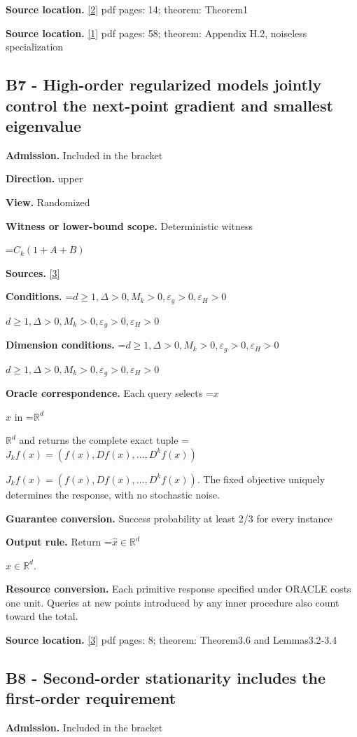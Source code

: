 \documentclass[10pt,a4paper]{article}
\newcommand{\AtlasMath}[1]{\par\begingroup\centering\setbox0=\hbox{$\displaystyle #1$}\ifdim\wd0>1.4\linewidth\typeout{ATLAS WIDE FORMULA: \the\wd0}\fi\ifdim\wd0>\linewidth\resizebox{\linewidth}{!}{\box0}\else\box0\fi\par\endgroup}
\newcommand{\AtlasInlineMath}[1]{\begingroup\setbox0=\hbox{$#1$}\ifdim\wd0>.4\linewidth\endgroup\AtlasMath{#1}\else\endgroup$#1$\fi}
\begin{document}
\textbf{Source location.} \href{https://arxiv.org/abs/1710.11606}{[2]} pdf pages: 14; theorem: Theorem1

\textbf{Source location.} \href{https://proceedings.mlr.press/v125/arjevani20a/arjevani20a.pdf}{[1]} pdf pages: 58; theorem: Appendix H.2, noiseless specialization

\subsection{B7 - High-order regularized models jointly control the next-point gradient and smallest eigenvalue}
\textbf{Admission.} Included in the bracket

\textbf{Direction.} upper

\textbf{View.} Randomized

\textbf{Witness or lower-bound scope.} Deterministic witness

\AtlasMath{C_k(1+A+B)}
\textbf{Sources.} \href{https://arxiv.org/abs/1708.04044}{[3]}

\textbf{Conditions.} \AtlasInlineMath{d\ge 1,\Delta>0,M_k>0,\varepsilon_g>0,\varepsilon_H>0}

\textbf{Dimension conditions.} \AtlasInlineMath{d\ge 1,\Delta>0,M_k>0,\varepsilon_g>0,\varepsilon_H>0}

\textbf{Oracle correspondence.} Each query selects \AtlasInlineMath{x} in \AtlasInlineMath{\mathbb{R}^d} and returns the complete exact tuple \AtlasInlineMath{J_{k}f(x)=(f(x),Df(x),\ldots,D^{k}f(x))}. The fixed objective uniquely determines the response, with no stochastic noise.

\textbf{Guarantee conversion.} Success probability at least 2/3 for every instance

\textbf{Output rule.} Return \AtlasInlineMath{\widehat{x}\in \mathbb{R}^d}.

\textbf{Resource conversion.} Each primitive response specified under ORACLE costs one unit. Queries at new points introduced by any inner procedure also count toward the total.

\textbf{Source location.} \href{https://arxiv.org/abs/1708.04044}{[3]} pdf pages: 8; theorem: Theorem3.6 and Lemmas3.2-3.4

\subsection{B8 - Second-order stationarity includes the first-order requirement}
\textbf{Admission.} Included in the bracket
\end{document}
